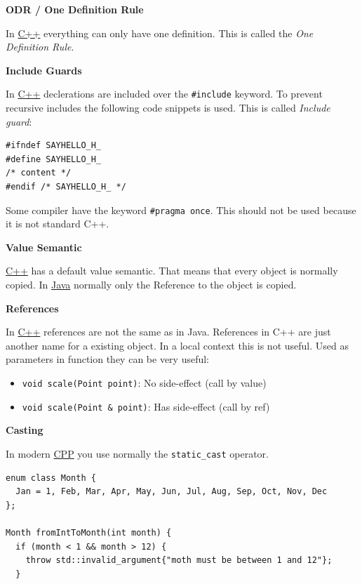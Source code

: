 \documentclass[11pt,twoside,landscape]{article}
\begin{document}
\begin{multicols}{3}
\textbf{ODR / One Definition Rule}

In \href{../../../roam/20210920103243-c.org}{C++} everything can only have one definition.
This is called the \emph{One Definition Rule}.

\textbf{Include Guards}

In \href{../../../roam/20210920103243-c.org}{C++} declerations are included over the \texttt{\#include} keyword.
To prevent recursive includes the following code snippets is used.
This is called \emph{Include guard}:
\lstset{language=c++,label= ,caption= ,captionpos=b,numbers=none}
\begin{lstlisting}
#ifndef SAYHELLO_H_
#define SAYHELLO_H_
/* content */
#endif /* SAYHELLO_H_ */
\end{lstlisting}

Some compiler have the keyword \texttt{\#pragma once}.
This should not be used because it is not standard C++.

\textbf{Value Semantic}

\href{../../../roam/20210920103243-c.org}{C++} has a default value semantic.
That means that every object is normally copied.
In \href{../../../roam/20201116150053-java.org}{Java} normally only the Reference to the object is copied.

\textbf{References}

In \href{../../../roam/20210920103243-c.org}{C++} references are not the same as in Java.
References in C++ are just another name for a existing object.
In a local context this is not useful.
Used as parameters in function they can be very useful:

\begin{itemize}
\item \texttt{void scale(Point point)}: No side-effect (call by value)
\item \texttt{void scale(Point \& point)}: Has side-effect (call by ref)
\end{itemize}


\textbf{Casting}

In modern \href{../../../roam/20210920103243-c.org}{CPP} you use normally the \texttt{static\_cast} operator.

\lstset{language=c++,label= ,caption= ,captionpos=b,numbers=none}
\begin{lstlisting}
enum class Month {
  Jan = 1, Feb, Mar, Apr, May, Jun, Jul, Aug, Sep, Oct, Nov, Dec
};

Month fromIntToMonth(int month) {
  if (month < 1 && month > 12) {
    throw std::invalid_argument{"moth must be between 1 and 12"};
  }


\end{lstlisting}
\end{multicols}
\end{document}
